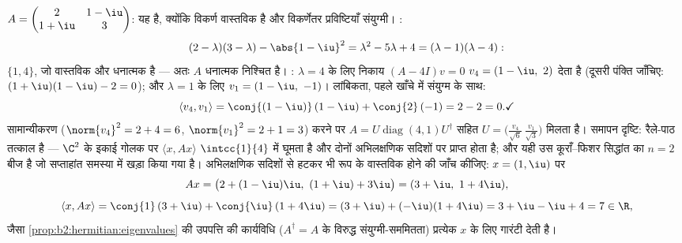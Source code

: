\begin{example}[एक धनात्मक निश्चित हर्मीशियन आव्यूह, किया हुआ]\label{ex:b2:hermitian:pdrun}
$A = \begin{pmatrix} 2 & 1-\iu\\ 1+\iu & 3\end{pmatrix}$: यह  है, क्योंकि विकर्ण वास्तविक है और विकर्णेतर
प्रविष्टियाँ संयुग्मी। :
\[
(2-\lambda)(3-\lambda) - \abs{1-\iu}^2
= \lambda^2 - 5\lambda + 4
= (\lambda - 1)(\lambda - 4) :
\]
 $\{1, 4\}$, जो वास्तविक और धनात्मक है --- अतः $A$ धनात्मक निश्चित है।
: $\lambda = 4$ के लिए निकाय $(A -
4I)v = 0$ $v_4 = (1 - \iu,\ 2)$ देता है (दूसरी पंक्ति जाँचिए:
$(1+\iu)(1-\iu) - 2 = 0$); और $\lambda = 1$ के लिए $v_1 = (1 - \iu,\
-1)$। लांबिकता, पहले खाँचे में संयुग्म के साथ:
\[
\langle v_4, v_1\rangle
= \conj{(1-\iu)}\,(1-\iu) + \conj{2}\,(-1)
= 2 - 2 = 0 . \checkmark
\]
सामान्यीकरण ($\norm{v_4}^2 = 2 + 4 = 6$, $\norm{v_1}^2 = 2 + 1
= 3$) करने पर $A =
U\operatorname{diag}(4,1)U^\dagger$ सहित  $U = \bigl(\frac{v_4}{\sqrt6}\
\frac{v_1}{\sqrt3}\bigr)$ मिलता है। समापन
दृष्टि: रैले-पाठ तत्काल है --- $\C^2$ के इकाई गोलक पर $\langle x, Ax\rangle$ $\intcc{1}{4}$ में घूमता है
और दोनों अभिलक्षणिक सदिशों पर प्राप्त होता है; और यही उस कूराँ--फिशर
सिद्धांत का $n = 2$ बीज है जो सप्ताहांत समस्या में खड़ा किया गया है।
अभिलक्षणिक सदिशों से हटकर भी रूप के वास्तविक होने की जाँच कीजिए: $x = (1, \iu)$ पर
\[
Ax = \bigl(2 + (1-\iu)\iu,\ (1+\iu) + 3\iu\bigr)
= (3 + \iu,\ 1 + 4\iu),
\]
\[
\langle x, Ax\rangle = \conj{1}\,(3+\iu) +
\conj{\iu}\,(1+4\iu)
= (3 + \iu) + (-\iu)(1 + 4\iu) = 3 + \iu - \iu + 4 = 7 \in
\R ,
\]
जैसा \cref{prop:b2:hermitian:eigenvalues} की उपपत्ति की कार्यविधि ($A^\dagger = A$ के विरुद्ध संयुग्मी-सममितता)
प्रत्येक $x$ के लिए गारंटी देती है।
\end{example}

